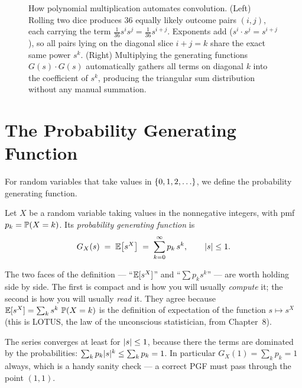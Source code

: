 \begin{figure}[H]
\caption{How polynomial multiplication automates convolution. (Left) Rolling two dice produces $36$ equally likely outcome pairs $(i,j)$, each carrying the term $\frac{1}{36}s^i s^j = \frac{1}{36}s^{i+j}$. Exponents add ($s^i \cdot s^j = s^{i+j}$), so all pairs lying on the diagonal slice $i+j=k$ share the exact same power $s^k$. (Right) Multiplying the generating functions $G(s)\cdot G(s)$ automatically gathers all terms on diagonal $k$ into the coefficient of $s^k$, producing the triangular sum distribution without any manual summation.}
\label{ch18:fig-coatrack-conv}
\end{figure}

\section{The Probability Generating Function}
\label{ch18:pgf}

For random variables that take values in $\set{0,1,2,\dots}$, we define the probability generating function.

\begin{definition}
\label{ch18:def-pgf}
Let $X$ be a random variable taking values in the nonnegative integers, with
pmf $p_k=\P(X=k)$. Its \emph{probability generating function} is
\[
  G_X(s) \;=\; \E\!\left[s^X\right] \;=\; \sum_{k=0}^{\infty} p_k\, s^k ,
  \qquad \abs{s}\le 1 .
\]
\end{definition}

The two faces of the definition --- ``$\E[s^X]$'' and ``$\sum p_k s^k$'' --- are
worth holding side by side. The first is compact and is how you will usually
\emph{compute} it; the second is how you will usually
\emph{read} it. They agree because $\E[s^X]=\sum_k s^k\,\P(X=k)$ is the
definition of expectation of the function $s\mapsto s^X$ (this is LOTUS, the law
of the unconscious statistician, from Chapter~8).

The series converges at least for $\abs{s}\le 1$, because there the terms are
dominated by the probabilities: $\sum_k p_k \abs{s}^k \le \sum_k p_k = 1$.
In particular $G_X(1)=\sum_k p_k = 1$ always, which is a handy sanity check ---
a correct PGF must pass through the point $(1,1)$.

